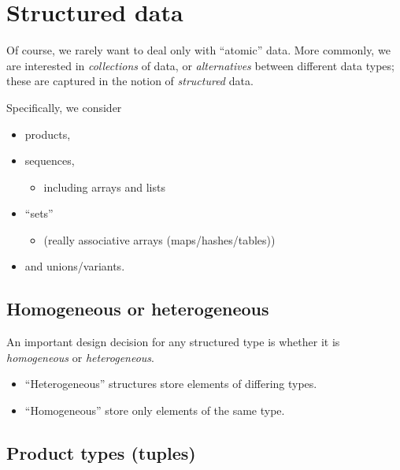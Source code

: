 \documentclass[11pt]{article}
\theoremstyle{definition}
\begin{document}
\section{Structured data}
\label{sec:org5181265}

Of course, we rarely want to deal only with “atomic” data.
More commonly, we are interested in \emph{collections} of data,
or \emph{alternatives} between different data types;
these are captured in the notion of \emph{structured} data.

Specifically, we consider
\begin{itemize}
\item products,
\item sequences,
\begin{itemize}
\item including arrays and lists
\end{itemize}
\item “sets”
\begin{itemize}
\item (really associative arrays (maps/hashes/tables))
\end{itemize}
\item and unions/variants.
\end{itemize}

\subsection{Homogeneous or heterogeneous}
\label{sec:org4870800}

An important design decision for any structured type
is whether it is \emph{homogeneous} or \emph{heterogeneous}.
\begin{itemize}
\item “Heterogeneous” structures store elements of differing types.
\item “Homogeneous” store only elements of the same type.
\end{itemize}

\subsection{Product types (tuples)}
\label{sec:org07ee43d}
\end{document}
